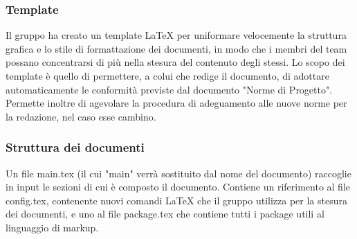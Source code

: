 		\subsubsection{Template}
		Il gruppo ha creato un template \LaTeX{} per uniformare velocemente la struttura grafica e lo stile di formattazione dei documenti, in modo che i membri del team possano concentrarsi di più nella stesura del contenuto degli stessi. Lo scopo dei template è quello di permettere, a colui che redige il documento, di adottare automaticamente le conformità previste dal documento "Norme di Progetto". Permette inoltre di agevolare la procedura di adeguamento alle nuove norme per la redazione, nel caso esse cambino.
		\subsubsection{Struttura dei documenti}
		Un file main.tex (il cui "main" verrà sostituito dal nome del documento) raccoglie in input le sezioni di cui è composto il documento. Contiene un riferimento al file config.tex, contenente nuovi comandi \LaTeX{} che il gruppo utilizza per la stesura dei documenti, e uno al file package.tex che contiene tutti i package utili al linguaggio di markup.
